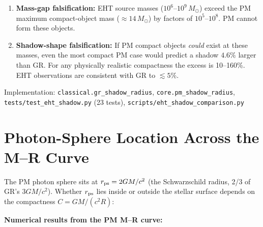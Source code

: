 \documentclass[10pt,twocolumn]{article}
\begin{document}
\begin{enumerate}
  \item \textbf{Mass-gap falsification:} EHT source masses
        ($10^6$--$10^9\,M_\odot$) exceed the PM maximum compact-object mass
        ($\approx\!14\,M_\odot$) by factors of $10^5$--$10^8$.
        PM cannot form these objects.
  \item \textbf{Shadow-shape falsification:} If PM compact objects
        \emph{could} exist at these masses, even the most compact PM case
        would predict a shadow $4.6\%$ larger than GR.  For any physically
        realistic compactness the excess is 10--160\%.  EHT observations are
        consistent with GR to $\lesssim5\%$.
\end{enumerate}

Implementation: \texttt{classical.gr\_shadow\_radius},
\texttt{core.pm\_shadow\_radius},
\texttt{tests/test\_eht\_shadow.py} (23 tests),
\texttt{scripts/eht\_shadow\_comparison.py}

\section{Photon-Sphere Location Across the M--R Curve}

\noindent The PM photon sphere sits at $r_{\rm ps} = 2GM/c^2$ (the Schwarzschild radius,
2/3 of GR's $3GM/c^2$).  Whether $r_{\rm ps}$ lies inside or outside the stellar
surface depends on the compactness $C = GM/(c^2 R)$:

\begin{center}
\end{center}

\textbf{Numerical results from the PM M--R curve:}
\end{document}
